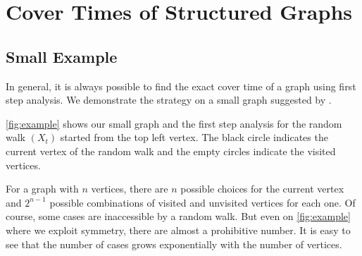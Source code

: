 \documentclass[12pt]{article}
\theoremstyle{definition}
\begin{document}
\section{Cover Times of Structured Graphs}\label{sec:structured_graphs}

\subsection{Small Example}\label{sec:small_example}
In general, it is always possible to find the exact cover time
of a graph using first step analysis.
We demonstrate the strategy on a small graph suggested by \cite{BH94}.

\cref{fig:example} shows our small graph and the first step analysis
for the random walk $(X_t)$ started from the top left vertex.
The black circle indicates the current vertex of the random walk
and the empty circles indicate the visited vertices.

For a graph with $n$ vertices, there are $n$ possible choices for the current
vertex and $2^{n-1}$ possible combinations of visited and unvisited vertices
for each one.
Of course, some cases are inaccessible by a random walk.
But even on \cref{fig:example} where we exploit symmetry,
there are almost a prohibitive number.
It is easy to see that the number of cases 
grows exponentially with the number of vertices.
\end{document}
